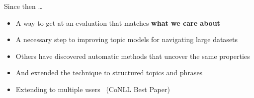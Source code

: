 \documentclass[compress]{beamer}
\newif\ifjobtalk\jobtalktrue
\begin{document}
\begin{frame}{Since then \dots}

  \begin{itemize}
    \item A way to get at an evaluation that matches {\bf what we care about}
    \item A necessary step to improving topic models for navigating large datasets~\cite{talley-11}
    \item Others have discovered automatic methods that uncover the same properties~\cite{newman-10,mimno-11}
    \item And extended the technique to structured topics and
      phrases~\cite{lindsey-12,weninger-12}
    \item \alert<2>{Extending to multiple users}~\cite{Felt-15}
      \ifjobtalk (CoNLL Best Paper) \fi
  \end{itemize}

\end{frame}


\begin{frame}[plain]
\vspace*{-1pt}
\end{frame}
\end{document}
